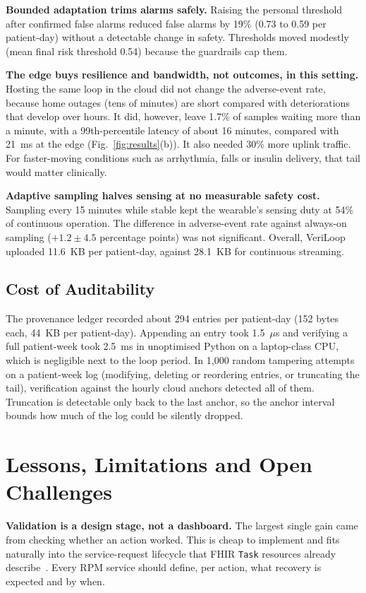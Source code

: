 \documentclass[journal]{IEEEtran}
\begin{document}
\textbf{Bounded adaptation trims alarms safely.} Raising the personal threshold after confirmed false alarms reduced
false alarms by 19\% (0.73 to 0.59 per patient-day) without a detectable change in safety. Thresholds moved
modestly (mean final risk threshold 0.54) because the guardrails cap them.

\textbf{The edge buys resilience and bandwidth, not outcomes, in this setting.} Hosting the same loop in the cloud did
not change the adverse-event rate, because home outages (tens of minutes) are short compared with deteriorations that
develop over hours. It did, however, leave 1.7\% of samples waiting more than a minute, with a 99th-percentile latency
of about 16 minutes, compared with 21~ms at the edge (Fig.~\ref{fig:results}(b)). It also needed 30\% more uplink
traffic. For faster-moving conditions such as arrhythmia, falls or insulin delivery, that tail would matter clinically.

\textbf{Adaptive sampling halves sensing at no measurable safety cost.} Sampling every 15 minutes while stable kept the
wearable's sensing duty at 54\% of continuous operation. The difference in adverse-event rate against always-on sampling
($+1.2\pm4.5$ percentage points) was not significant. Overall, VeriLoop uploaded 11.6~KB per patient-day, against 28.1~KB
for continuous streaming.

\subsection*{Cost of Auditability}

The provenance ledger recorded about 294 entries per patient-day (152 bytes each, 44~KB per patient-day). Appending an
entry took 1.5~$\mu$s and verifying a full patient-week took 2.5~ms in unoptimised Python on a laptop-class CPU, which is
negligible next to the loop period. In 1,000 random tampering attempts on a patient-week log (modifying, deleting or
reordering entries, or truncating the tail), verification against the hourly cloud anchors detected all of them.
Truncation is detectable only back to the last anchor, so the anchor interval bounds how much of the log could be
silently dropped.


\section*{Lessons, Limitations and Open Challenges}


\textbf{Validation is a design stage, not a dashboard.} The largest single gain came from checking whether an action
worked. This is cheap to implement and fits naturally into the service-request lifecycle that FHIR \texttt{Task}
resources already describe~\cite{fhir}. Every RPM service should define, per action, what recovery is expected and
by when.
\end{document}
